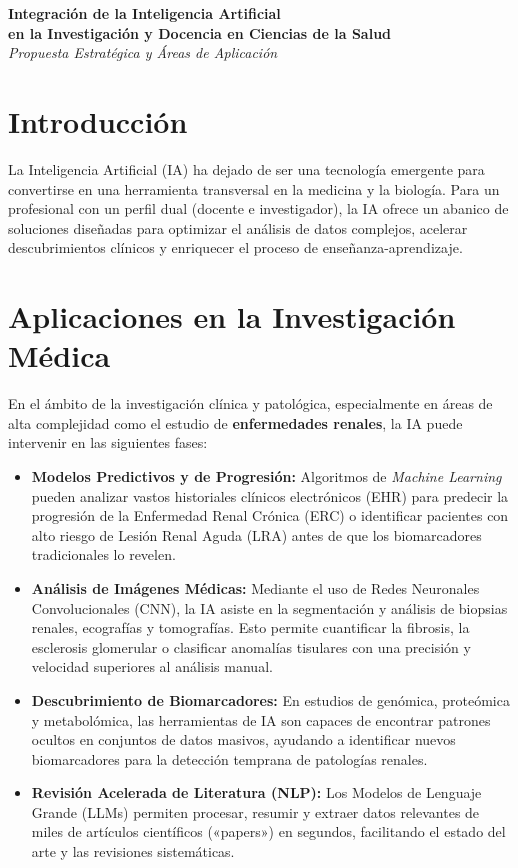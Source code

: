 \documentclass[12pt,letterpaper]{article}
\begin{document}
\begin{center}
    {\Huge \textbf{Integración de la Inteligencia Artificial}}\\[0.3cm]
    {\Large \textbf{en la Investigación y Docencia en Ciencias de la Salud}}\\[0.4cm]
    {\large \textit{Propuesta Estratégica y Áreas de Aplicación}}
\end{center}

\vspace{0.5cm}

\section{Introducción}
La Inteligencia Artificial (IA) ha dejado de ser una tecnología emergente para convertirse en una herramienta transversal en la medicina y la biología. Para un profesional con un perfil dual (docente e investigador), la IA ofrece un abanico de soluciones diseñadas para optimizar el análisis de datos complejos, acelerar descubrimientos clínicos y enriquecer el proceso de enseñanza-aprendizaje.

\section{Aplicaciones en la Investigación Médica}
En el ámbito de la investigación clínica y patológica, especialmente en áreas de alta complejidad como el estudio de \textbf{enfermedades renales}, la IA puede intervenir en las siguientes fases:

\begin{itemize}[label=\textcolor{saludBlue}{\textbullet}, leftmargin=*]
    \item \textbf{Modelos Predictivos y de Progresión:} Algoritmos de \textit{Machine Learning} pueden analizar vastos historiales clínicos electrónicos (EHR) para predecir la progresión de la Enfermedad Renal Crónica (ERC) o identificar pacientes con alto riesgo de Lesión Renal Aguda (LRA) antes de que los biomarcadores tradicionales lo revelen.
    \item \textbf{Análisis de Imágenes Médicas:} Mediante el uso de Redes Neuronales Convolucionales (CNN), la IA asiste en la segmentación y análisis de biopsias renales, ecografías y tomografías. Esto permite cuantificar la fibrosis, la esclerosis glomerular o clasificar anomalías tisulares con una precisión y velocidad superiores al análisis manual.
    \item \textbf{Descubrimiento de Biomarcadores:} En estudios de genómica, proteómica y metabolómica, las herramientas de IA son capaces de encontrar patrones ocultos en conjuntos de datos masivos, ayudando a identificar nuevos biomarcadores para la detección temprana de patologías renales.
    \item \textbf{Revisión Acelerada de Literatura (NLP):} Los Modelos de Lenguaje Grande (LLMs) permiten procesar, resumir y extraer datos relevantes de miles de artículos científicos («papers») en segundos, facilitando el estado del arte y las revisiones sistemáticas.
\end{itemize}
\end{document}
